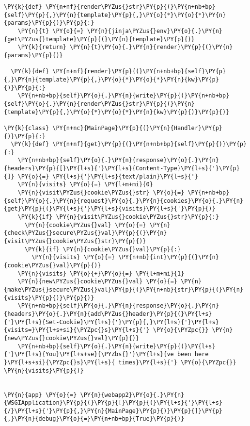 \begin{Verbatim}[commandchars=\\\{\}]
  \PY{k}{def} \PY{n+nf}{render\PYZus{}str}\PY{p}{(}\PY{n+nb+bp}{self}\PY{p}{,}\PY{n}{template}\PY{p}{,}\PY{o}{*}\PY{o}{*}\PY{n}{params}\PY{p}{)}\PY{p}{:}
    \PY{n}{t} \PY{o}{=} \PY{n}{jinja\PYZus{}env}\PY{o}{.}\PY{n}{get\PYZus{}template}\PY{p}{(}\PY{n}{template}\PY{p}{)}
    \PY{k}{return} \PY{n}{t}\PY{o}{.}\PY{n}{render}\PY{p}{(}\PY{n}{params}\PY{p}{)}

  \PY{k}{def} \PY{n+nf}{render}\PY{p}{(}\PY{n+nb+bp}{self}\PY{p}{,}\PY{n}{template}\PY{p}{,}\PY{o}{*}\PY{o}{*}\PY{n}{kw}\PY{p}{)}\PY{p}{:}
    \PY{n+nb+bp}{self}\PY{o}{.}\PY{n}{write}\PY{p}{(}\PY{n+nb+bp}{self}\PY{o}{.}\PY{n}{render\PYZus{}str}\PY{p}{(}\PY{n}{template}\PY{p}{,}\PY{o}{*}\PY{o}{*}\PY{n}{kw}\PY{p}{)}\PY{p}{)}

\PY{k}{class} \PY{n+nc}{MainPage}\PY{p}{(}\PY{n}{Handler}\PY{p}{)}\PY{p}{:}
  \PY{k}{def} \PY{n+nf}{get}\PY{p}{(}\PY{n+nb+bp}{self}\PY{p}{)}\PY{p}{:}
    \PY{n+nb+bp}{self}\PY{o}{.}\PY{n}{response}\PY{o}{.}\PY{n}{headers}\PY{p}{[}\PY{l+s}{'}\PY{l+s}{Content-Type}\PY{l+s}{'}\PY{p}{]} \PY{o}{=} \PY{l+s}{'}\PY{l+s}{text/plain}\PY{l+s}{'}
    \PY{n}{visits} \PY{o}{=} \PY{l+m+mi}{0}
    \PY{n}{visit\PYZus{}cookie\PYZus{}str} \PY{o}{=} \PY{n+nb+bp}{self}\PY{o}{.}\PY{n}{request}\PY{o}{.}\PY{n}{cookies}\PY{o}{.}\PY{n}{get}\PY{p}{(}\PY{l+s}{'}\PY{l+s}{visits}\PY{l+s}{'}\PY{p}{)}
    \PY{k}{if} \PY{n}{visit\PYZus{}cookie\PYZus{}str}\PY{p}{:}
      \PY{n}{cookie\PYZus{}val} \PY{o}{=} \PY{n}{check\PYZus{}secure\PYZus{}val}\PY{p}{(}\PY{n}{visit\PYZus{}cookie\PYZus{}str}\PY{p}{)}
      \PY{k}{if} \PY{n}{cookie\PYZus{}val}\PY{p}{:}
        \PY{n}{visits} \PY{o}{=} \PY{n+nb}{int}\PY{p}{(}\PY{n}{cookie\PYZus{}val}\PY{p}{)}
    \PY{n}{visits} \PY{o}{+}\PY{o}{=} \PY{l+m+mi}{1}
    \PY{n}{new\PYZus{}cookie\PYZus{}val} \PY{o}{=} \PY{n}{make\PYZus{}secure\PYZus{}val}\PY{p}{(}\PY{n+nb}{str}\PY{p}{(}\PY{n}{visits}\PY{p}{)}\PY{p}{)}
    \PY{n+nb+bp}{self}\PY{o}{.}\PY{n}{response}\PY{o}{.}\PY{n}{headers}\PY{o}{.}\PY{n}{add\PYZus{}header}\PY{p}{(}\PY{l+s}{'}\PY{l+s}{Set-Cookie}\PY{l+s}{'}\PY{p}{,}\PY{l+s}{'}\PY{l+s}{visits=}\PY{l+s+si}{\PYZpc{}s}\PY{l+s}{'} \PY{o}{\PYZpc{}} \PY{n}{new\PYZus{}cookie\PYZus{}val}\PY{p}{)}
    \PY{n+nb+bp}{self}\PY{o}{.}\PY{n}{write}\PY{p}{(}\PY{l+s}{'}\PY{l+s}{You}\PY{l+s+se}{\PYZbs{}'}\PY{l+s}{ve been here }\PY{l+s+si}{\PYZpc{}s}\PY{l+s}{ times}\PY{l+s}{'} \PY{o}{\PYZpc{}} \PY{n}{visits}\PY{p}{)}
    

\PY{n}{app} \PY{o}{=} \PY{n}{webapp2}\PY{o}{.}\PY{n}{WSGIApplication}\PY{p}{(}\PY{p}{[}\PY{p}{(}\PY{l+s}{'}\PY{l+s}{/}\PY{l+s}{'}\PY{p}{,}\PY{n}{MainPage}\PY{p}{)}\PY{p}{]}\PY{p}{,}\PY{n}{debug}\PY{o}{=}\PY{n+nb+bp}{True}\PY{p}{)}
\end{Verbatim}
